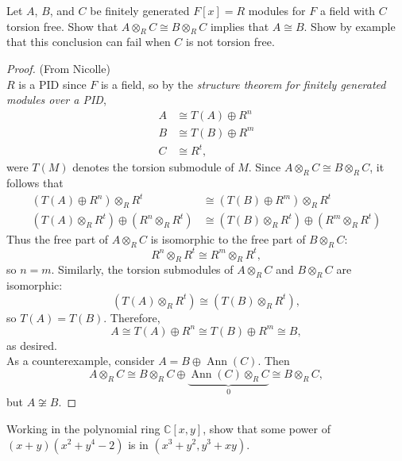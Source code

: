 \documentclass{article}
\newenvironment{problem}[2][Problem]{\begin{trivlist}
\item[\hskip \labelsep {\bfseries #1}\hskip \labelsep {\bfseries #2.}]}{\end{trivlist}}
\newcommand{\C}{\mathbb C}
\newcommand{\Ann}{\operatorname{Ann}}
\begin{document}
\begin{problem}{2}
  Let $A$, $B$, and $C$ be finitely generated $F[x] = R$ modules for $F$ a field
  with $C$ torsion free. Show that $A \otimes_R C \cong B \otimes_R C$ implies
  that $A \cong B$.
  Show by example that this conclusion can fail when $C$ is not torsion free.
\end{problem}
\begin{proof}(From Nicolle)\\
  $R$ is a PID since $F$ is a field, so by the
  \textit{structure theorem for finitely generated modules over a PID},
  \begin{align*}
    A &\cong T(A) \oplus R^n \\
    B &\cong T(B) \oplus R^m \\
    C &\cong R^t,
  \end{align*} were $T(M)$ denotes the torsion submodule of $M$.
  Since $A \otimes_R C \cong B \otimes_R C$, it follows that \begin{align*}
    (T(A) \oplus R^n) \otimes_R R^t &\cong (T(B) \oplus R^m) \otimes_R R^t \\
    (T(A) \otimes_R R^t) \oplus (R^n \otimes_R R^t) &\cong (T(B) \otimes_R R^t) \oplus (R^m \otimes_R R^t)
  \end{align*}
  Thus the free part of $A \otimes_R C$ is isomorphic to the free part of
  $B \otimes_R C$: \[
    R^n \otimes_R R^t \cong R^m \otimes_R R^t,
  \] so $n = m$. Similarly, the torsion submodules of $A \otimes_R C$ and
  $B \otimes_R C$ are isomorphic: \[
    (T(A) \otimes_R R^t) \cong (T(B) \otimes_R R^t),
  \] so $T(A) = T(B)$. Therefore, \[
    A \cong T(A) \oplus R^n \cong T(B) \oplus R^m \cong B,
  \] as desired.
  \\

  As a counterexample, consider $A = B \oplus \Ann(C)$. Then \[
    A \otimes_R C
    \cong B \otimes_R C \oplus \underbrace{\Ann(C) \otimes_R C}_0
    \cong B \otimes_R C,
  \] but $A \not\cong B$.
\end{proof}
\pagebreak

\begin{problem}{3}
  Working in the polynomial ring $\C[x, y]$, show that some power of $(x + y)(x^2 + y^4 -2)$ is in $(x^3 + y^2, y^3 + xy)$.
\end{problem}
\end{document}
